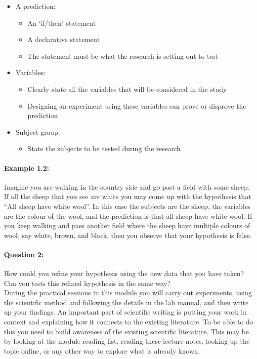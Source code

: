 \documentclass[a4paper,12pt]{book}
\begin{document}
\begin{itemize}
\setlength{\itemsep}{-5pt}
    \item A prediction:
    \begin{itemize}
\setlength{\itemsep}{-5pt}
    \item An `if/then' statement
    \item A declarative statement
    \item The statement must be what the research is setting out to test
\end{itemize}
    \item Variables:
    \begin{itemize}
\setlength{\itemsep}{-5pt}
    \item Clearly state all the variables that will be considered in the study
    \item Designing an experiment using these variables can prove or disprove the prediction
\end{itemize}
    \item Subject group: 
    \begin{itemize}
\setlength{\itemsep}{-5pt}
    \item State the subjects to be tested during the research
\end{itemize}
\end{itemize}

\paragraph{Example 1.2:}Imagine you are walking in the country side and go past a field with some sheep. If all the sheep that you see are white you may come up with the hypothesis that ``All sheep have white wool''. In this case the subjects are the sheep, the variables are the colour of the wool, and the prediction is that all sheep have white wool. If you keep walking and pass another field where the sheep have multiple colours of wool, say white, brown, and black, then you observe that your hypothesis is false.

\paragraph{Question 2:} How could you refine your hypothesis using the new data that you have taken? Can you tests this refined hypothesis in the same way?\\

During the practical sessions in this module you will carry out experiments, using the scientific method and following the details in the lab manual, and then write up your findings. An important part of scientific writing is putting your work in context and explaining how it connects to the existing literature. To be able to do this you need to build awareness of the existing scientific literature. This may be by looking at the module reading list, reading these lecture notes, looking up the topic online, or any other way to explore what is already known.\\
\end{document}
